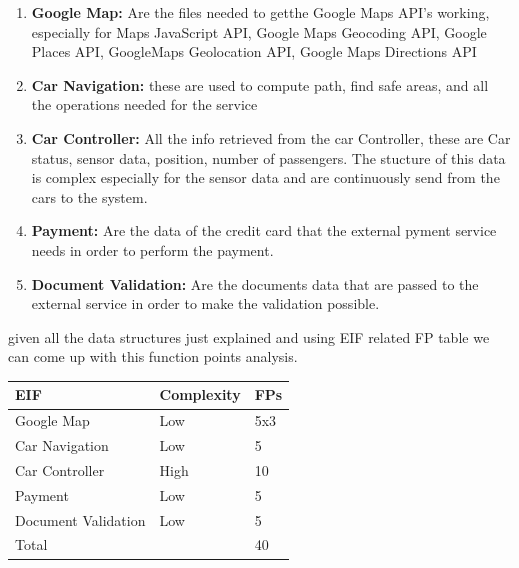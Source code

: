 \documentclass[english]{article}
\newenvironment{fpcounttable}[1]{
	\begin{center}
	\begin{longtable}{|l|l|l|}
	\hline 
	#1 & Complexity & FPs \\\hline
}{
	\end{longtable}\end{center}
}
\newcommand{\fptotal}[1]{
	\multicolumn{2}{|l|}{{Total}}
	& #1\\\hline
}
\newcommand{\elh}{ & High & 10}
\newcommand{\ello}{ & Low & 5}
\begin{document}
\begin {enumerate}
	\item \textbf{Google Map:} Are the files needed to getthe Google Maps API's working, especially for Maps JavaScript API, Google Maps Geocoding API, Google Places API, GoogleMaps Geolocation API, Google Maps Directions API
	\item \textbf{Car Navigation:} these are used to compute path, find safe areas, and all the operations  needed for  the service
	\item \textbf{Car Controller:}  All  the info retrieved from the  car Controller, these are Car status, sensor data, position, number of passengers. The stucture of this data is complex especially for the sensor data and are continuously  send from the cars to the system.
	\item \textbf{Payment:} Are the data of the credit card that the external pyment service needs in order to perform the payment.
	\item \textbf{Document Validation:} Are the documents data that are passed to the external  service in order to make the validation possible.
\end {enumerate}
given all the data structures just explained and using EIF related FP table we can come up with this function points analysis.
\begin{fpcounttable}{EIF}
Google Map\ello x3 \\
Car Navigation\ello \\
Car Controller\elh \\
Payment \ello\\
Document Validation \ello\\\hline
\fptotal{40}	
\end{fpcounttable}
\end{document}
